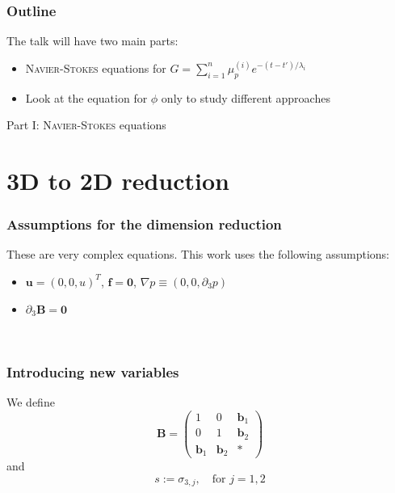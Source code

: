 \documentclass[12pt,a4paper,handout]{beamer}
\theoremstyle{definition}
\theoremstyle{plain}
\newcommand{\bfu}{\bm{u}}
\newcommand{\bff}{\bm{f}}
\newcommand{\bfB}{\bm{B}}
\newcommand{\bfb}{\bm{b}}
\begin{document}
\begin{frame}
    \frametitle{Outline}
    The talk will have two main parts:
    \begin{itemize}
        \item \textsc{Navier-Stokes} equations for $G=\sum_{i=1}^{n}\mu_p^{(i)}e^{-(t-t')/\lambda_i}$
        \item Look at the equation for $\phi$ only to study different approaches
    \end{itemize}
\end{frame}
\begin{frame}
    \Huge{Part I: \textsc{Navier-Stokes} equations}
\end{frame}
\section{3D to 2D reduction}
    \begin{frame}
        \frametitle{Assumptions for the dimension reduction}
        These are very complex equations. This work uses the following assumptions:
        \begin{itemize}[<+->]
            \item $\bfu= (0,0,u)^T$, $\bff=\bm{0}$, $\nabla p\equiv(0,0,\partial_3 p)$
            \item $\partial_3\bfB =\bm{0}$
         \end{itemize}
    \\
    
    \end{frame}
\begin{frame}
    \frametitle{Introducing new variables}
    We define
     \begin{equation*}
    \bfB=\begin{pmatrix}
    1&0&\bfb_1\\
    0&1&\bfb_2\\
    \bfb_1&\bfb_2&*
    \end{pmatrix}
    \end{equation*}
    and
    \begin{equation*}
        s:=\sigma_{3,j},\quad \text{for }j=1,2
    \end{equation*}
\end{frame}
\end{document}
